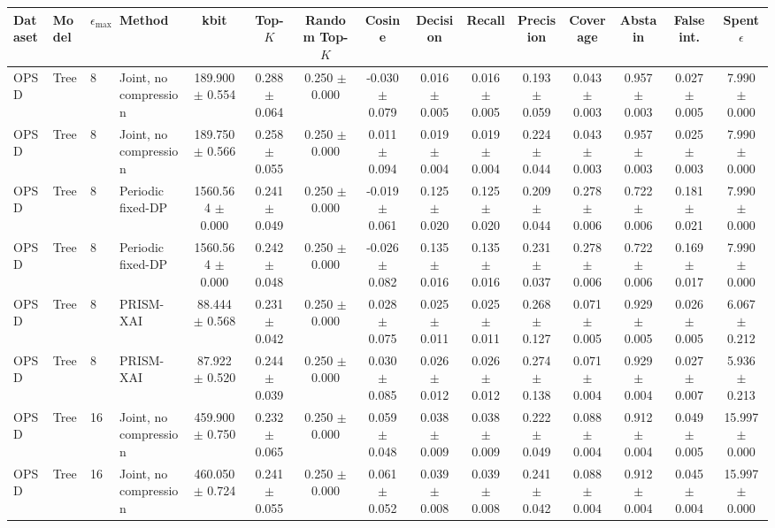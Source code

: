 \begin{tabular}{llllccccccccccc}
\toprule
Dataset & Model & $\epsilon_{\max}$ & Method & kbit & Top-$K$ & Random Top-$K$ & Cosine & Decision & Recall & Precision & Coverage & Abstain & False int. & Spent $\epsilon$ \\
\midrule
OPSD & Tree & 8 & Joint, no compression & 189.900 $\pm$ 0.554 & 0.288 $\pm$ 0.064 & 0.250 $\pm$ 0.000 & -0.030 $\pm$ 0.079 & 0.016 $\pm$ 0.005 & 0.016 $\pm$ 0.005 & 0.193 $\pm$ 0.059 & 0.043 $\pm$ 0.003 & 0.957 $\pm$ 0.003 & 0.027 $\pm$ 0.005 & 7.990 $\pm$ 0.000 \\
OPSD & Tree & 8 & Joint, no compression & 189.750 $\pm$ 0.566 & 0.258 $\pm$ 0.055 & 0.250 $\pm$ 0.000 & 0.011 $\pm$ 0.094 & 0.019 $\pm$ 0.004 & 0.019 $\pm$ 0.004 & 0.224 $\pm$ 0.044 & 0.043 $\pm$ 0.003 & 0.957 $\pm$ 0.003 & 0.025 $\pm$ 0.003 & 7.990 $\pm$ 0.000 \\
OPSD & Tree & 8 & Periodic fixed-DP & 1560.564 $\pm$ 0.000 & 0.241 $\pm$ 0.049 & 0.250 $\pm$ 0.000 & -0.019 $\pm$ 0.061 & 0.125 $\pm$ 0.020 & 0.125 $\pm$ 0.020 & 0.209 $\pm$ 0.044 & 0.278 $\pm$ 0.006 & 0.722 $\pm$ 0.006 & 0.181 $\pm$ 0.021 & 7.990 $\pm$ 0.000 \\
OPSD & Tree & 8 & Periodic fixed-DP & 1560.564 $\pm$ 0.000 & 0.242 $\pm$ 0.048 & 0.250 $\pm$ 0.000 & -0.026 $\pm$ 0.082 & 0.135 $\pm$ 0.016 & 0.135 $\pm$ 0.016 & 0.231 $\pm$ 0.037 & 0.278 $\pm$ 0.006 & 0.722 $\pm$ 0.006 & 0.169 $\pm$ 0.017 & 7.990 $\pm$ 0.000 \\
OPSD & Tree & 8 & PRISM-XAI & 88.444 $\pm$ 0.568 & 0.231 $\pm$ 0.042 & 0.250 $\pm$ 0.000 & 0.028 $\pm$ 0.075 & 0.025 $\pm$ 0.011 & 0.025 $\pm$ 0.011 & 0.268 $\pm$ 0.127 & 0.071 $\pm$ 0.005 & 0.929 $\pm$ 0.005 & 0.026 $\pm$ 0.005 & 6.067 $\pm$ 0.212 \\
OPSD & Tree & 8 & PRISM-XAI & 87.922 $\pm$ 0.520 & 0.244 $\pm$ 0.039 & 0.250 $\pm$ 0.000 & 0.030 $\pm$ 0.085 & 0.026 $\pm$ 0.012 & 0.026 $\pm$ 0.012 & 0.274 $\pm$ 0.138 & 0.071 $\pm$ 0.004 & 0.929 $\pm$ 0.004 & 0.027 $\pm$ 0.007 & 5.936 $\pm$ 0.213 \\
OPSD & Tree & 16 & Joint, no compression & 459.900 $\pm$ 0.750 & 0.232 $\pm$ 0.065 & 0.250 $\pm$ 0.000 & 0.059 $\pm$ 0.048 & 0.038 $\pm$ 0.009 & 0.038 $\pm$ 0.009 & 0.222 $\pm$ 0.049 & 0.088 $\pm$ 0.004 & 0.912 $\pm$ 0.004 & 0.049 $\pm$ 0.005 & 15.997 $\pm$ 0.000 \\
OPSD & Tree & 16 & Joint, no compression & 460.050 $\pm$ 0.724 & 0.241 $\pm$ 0.055 & 0.250 $\pm$ 0.000 & 0.061 $\pm$ 0.052 & 0.039 $\pm$ 0.008 & 0.039 $\pm$ 0.008 & 0.241 $\pm$ 0.042 & 0.088 $\pm$ 0.004 & 0.912 $\pm$ 0.004 & 0.045 $\pm$ 0.004 & 15.997 $\pm$ 0.000 \\

\end{tabular}
